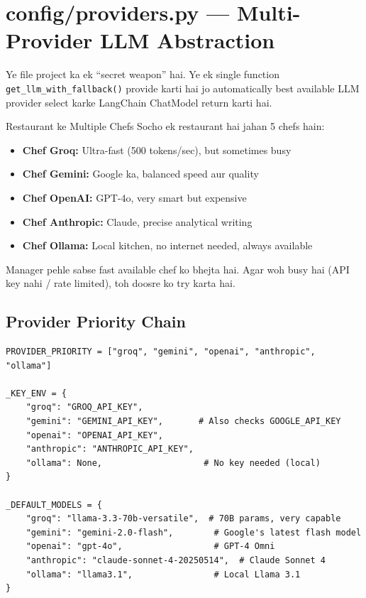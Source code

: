 \documentclass[11pt,a4paper,twoside]{report}
\begin{document}
\section{config/providers.py --- Multi-Provider LLM Abstraction}

Ye file project ka ek ``secret weapon'' hai. Ye ek single function \texttt{get\_llm\_with\_fallback()} provide karti hai jo automatically best available LLM provider select karke LangChain ChatModel return karti hai.

\begin{analogy}{Restaurant ke Multiple Chefs}
Socho ek restaurant hai jahan 5 chefs hain:
\begin{itemize}
    \item \textbf{Chef Groq:} Ultra-fast (500 tokens/sec), but sometimes busy
    \item \textbf{Chef Gemini:} Google ka, balanced speed aur quality
    \item \textbf{Chef OpenAI:} GPT-4o, very smart but expensive
    \item \textbf{Chef Anthropic:} Claude, precise analytical writing
    \item \textbf{Chef Ollama:} Local kitchen, no internet needed, always available
\end{itemize}
Manager pehle sabse fast available chef ko bhejta hai. Agar woh busy hai (API key nahi / rate limited), toh doosre ko try karta hai.
\end{analogy}

\subsection{Provider Priority Chain}

\begin{lstlisting}[style=pythonstyle]
PROVIDER_PRIORITY = ["groq", "gemini", "openai", "anthropic", "ollama"]

_KEY_ENV = {
    "groq": "GROQ_API_KEY",
    "gemini": "GEMINI_API_KEY",       # Also checks GOOGLE_API_KEY
    "openai": "OPENAI_API_KEY",
    "anthropic": "ANTHROPIC_API_KEY",
    "ollama": None,                    # No key needed (local)
}

_DEFAULT_MODELS = {
    "groq": "llama-3.3-70b-versatile",  # 70B params, very capable
    "gemini": "gemini-2.0-flash",        # Google's latest flash model
    "openai": "gpt-4o",                  # GPT-4 Omni
    "anthropic": "claude-sonnet-4-20250514",  # Claude Sonnet 4
    "ollama": "llama3.1",                # Local Llama 3.1
}
\end{lstlisting}
\end{document}
